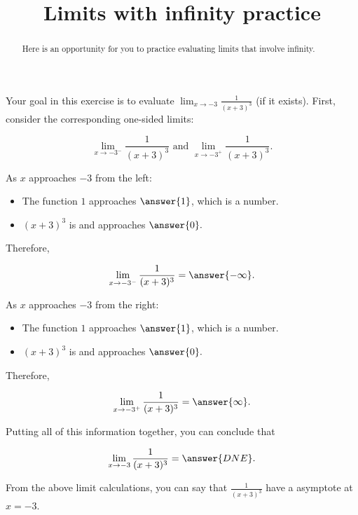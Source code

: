\documentclass[handout]{ximera}
\title{Limits with infinity practice}
\begin{document}
\begin{abstract}
Here is an opportunity for you to practice evaluating limits that involve infinity.  
\end{abstract}
\maketitle

\begin{exercise}
Your goal in this exercise is to evaluate $\displaystyle\lim_{x \to -3} \frac{1}{(x+3)^3}$ (if it exists).  First, consider the corresponding one-sided limits:

$$\lim_{x \to -3^-} \frac{1}{(x+3)^3} \text{ and } \lim_{x \to -3^+} \frac{1}{(x+3)^3}.$$

As $x$ approaches $-3$ from the left:  

\begin{itemize}

\item The function $1$ approaches $\answer{1}$, which is a  number. 

\item $(x+3)^3$ is  and approaches $\answer{0}.$ 

\end{itemize}

Therefore, 

 \[ \lim_{x \to -3^-} \frac{1}{(x+3)^3} = \answer{-\infty}.\]
 
As $x$ approaches $-3$ from the right: 

\begin{itemize}

\item The function $1$ approaches $\answer{1}$, which is a  number. 

\item $(x+3)^3$ is  and approaches $\answer{0}.$ 

\end{itemize}

Therefore, 

 \[ \lim_{x \to -3^+} \frac{1}{(x+3)^3} = \answer{\infty}. \]

Putting all of this information together, you can conclude that

\[ \lim_{x \to -3} \frac{1}{(x+3)^3} = \answer{DNE}. \]

\begin{exercise}

From the above limit calculations, you can say that $\frac{1}{(x+3)^3}$  have a  asymptote at $x =-3$. 

\end{exercise}

\end{exercise}
\end{document}
